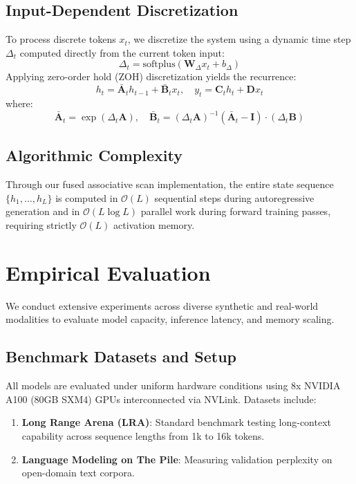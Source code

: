 \documentclass{article}
\begin{document}
\subsection{Input-Dependent Discretization}
To process discrete tokens $x_t$, we discretize the system using a dynamic time step $\Delta_t$ computed directly from the current token input:
\begin{equation}
\Delta_t = \text{softplus}\left(\mathbf{W}_\Delta x_t + b_\Delta\right)
\end{equation}
Applying zero-order hold (ZOH) discretization yields the recurrence:
\begin{equation}
h_t = \mathbf{\bar{A}}_t h_{t-1} + \mathbf{\bar{B}}_t x_t, \quad y_t = \mathbf{C}_t h_t + \mathbf{D} x_t
\end{equation}
where:
\begin{equation}
\mathbf{\bar{A}}_t = \exp(\Delta_t \mathbf{A}), \quad \mathbf{\bar{B}}_t = (\Delta_t \mathbf{A})^{-1} (\mathbf{\bar{A}}_t - \mathbf{I}) \cdot (\Delta_t \mathbf{B})
\end{equation}

\subsection{Algorithmic Complexity}
Through our fused associative scan implementation, the entire state sequence $\{h_1, \dots, h_L\}$ is computed in $\mathcal{O}(L)$ sequential steps during autoregressive generation and in $\mathcal{O}(L \log L)$ parallel work during forward training passes, requiring strictly $\mathcal{O}(L)$ activation memory.


\section{Empirical Evaluation}
We conduct extensive experiments across diverse synthetic and real-world modalities to evaluate model capacity, inference latency, and memory scaling.

\subsection{Benchmark Datasets and Setup}
All models are evaluated under uniform hardware conditions using 8x NVIDIA A100 (80GB SXM4) GPUs interconnected via NVLink. Datasets include:
\begin{enumerate}
  \item \textbf{Long Range Arena (LRA)}: Standard benchmark testing long-context capability across sequence lengths from 1k to 16k tokens.
  \item \textbf{Language Modeling on The Pile}: Measuring validation perplexity on open-domain text corpora.
\end{enumerate}
\end{document}
